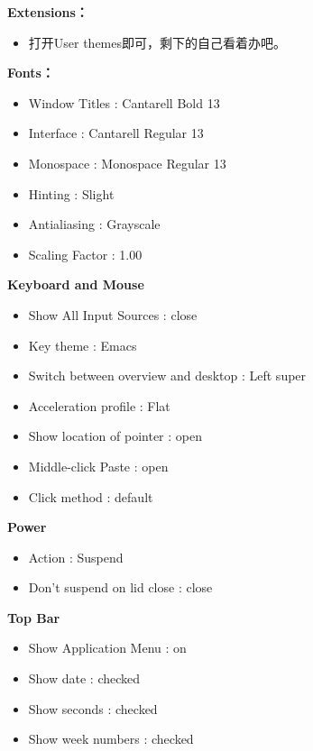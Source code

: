 \noindent{}\textbf{\color{magenta}Extensions：}
\begin{itemize}
\item{打开User themes即可，剩下的自己看着办吧。}
\end{itemize}

\noindent{}\textbf{\color{magenta}Fonts：}
\begin{itemize}
\item{Window Titles : Cantarell Bold 13}
\item{Interface : Cantarell Regular 13}
\item{Monospace : Monospace Regular 13}
\item{Hinting : Slight}
\item{Antialiasing : Grayscale}
\item{Scaling Factor : 1.00}
\end{itemize}

\noindent{}\textbf{\color{magenta}Keyboard and Mouse}
\begin{itemize}
\item{Show All Input Sources : close}
\item{Key theme : Emacs}
\item{Switch between overview and desktop : Left super}
\item{Acceleration profile : Flat}
\item{Show location of pointer : open}
\item{Middle-click Paste : open}
\item{Click method : default}
\end{itemize}

\noindent{}\textbf{\color{magenta}Power}
\begin{itemize}
\item{Action : Suspend}
\item{Don't suspend on lid close : close}
\end{itemize}

\noindent{}\textbf{\color{magenta}Top Bar}
\begin{itemize}
\item{Show Application Menu : on}
\item{Show date : checked}
\item{Show seconds : checked}
\item{Show week numbers : checked}
\end{itemize}







